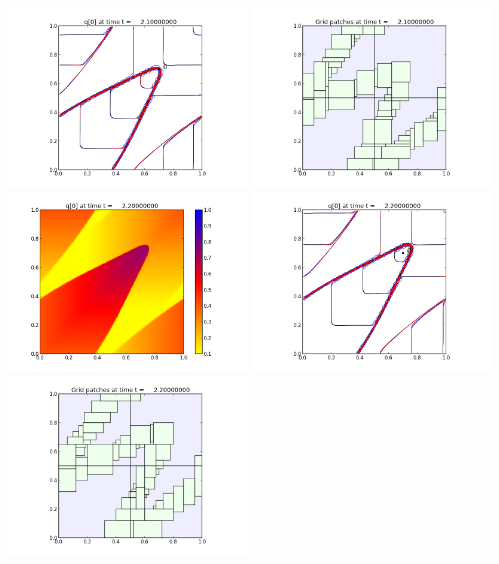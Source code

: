 \documentclass[11pt]{article}
\begin{document}
\includegraphics[width=0.475\textwidth]{frame0021fig1.png}
\vskip 10pt 
\includegraphics[width=0.475\textwidth]{frame0021fig2.png}
\vskip 10pt 
\includegraphics[width=0.475\textwidth]{frame0022fig0.png}
\includegraphics[width=0.475\textwidth]{frame0022fig1.png}
\vskip 10pt 
\includegraphics[width=0.475\textwidth]{frame0022fig2.png}
\end{document}

